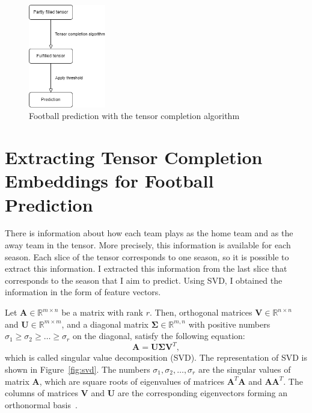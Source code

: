 \documentclass[thesis=M,english]{FITthesis}[2019/12/23]
\begin{document}
\begin{figure}[h]
    \centering
    \includegraphics[width=0.3\textwidth]{figures/diagram.png}
    \caption{Football prediction with the tensor completion algorithm}
    \label{fig:diagram}
\end{figure}

\section{Extracting Tensor Completion Embeddings for Football Prediction}
\label{embeddings}

There is information about how each team plays as the home team and as the away team in the tensor. More precisely, this information is available for each season. Each slice of the tensor corresponds to one season, so it is possible to extract this information. I extracted this information from the last slice that corresponds to the season that I aim to predict. Using SVD, I obtained the information in the form of feature vectors.

Let $\boldsymbol{A} \in \mathbb{R}^{m \times n}$ be a matrix with rank $r$. Then, orthogonal matrices $\boldsymbol{V} \in \mathbb{R}^{n \times n}$ and $\boldsymbol{U} \in \mathbb{R}^{m \times m}$, and a diagonal matrix $\boldsymbol{\Sigma} \in \mathbb{R}^{m, n}$ with positive numbers $\sigma_1 \ge \sigma_2 \ge \dots \ge \sigma_r$ on the diagonal, satisfy the following equation:
$$\boldsymbol{A} = \boldsymbol{U} \boldsymbol{\Sigma} \boldsymbol{V}^T,$$
which is called singular value decomposition (SVD). The representation of SVD is shown in Figure~\ref{fig:svd}. The numbers $\sigma_1, \sigma_2, \dots, \sigma_r$ are the singular values of matrix $\boldsymbol{A}$, which are square roots of eigenvalues of matrices $\boldsymbol{A}^T \boldsymbol{A}$ and $\boldsymbol{A} \boldsymbol{A}^T$. The columns of matrices $\boldsymbol{V}$ and $\boldsymbol{U}$ are the corresponding eigenvectors forming an orthonormal basis~\cite{svd}.
\end{document}
